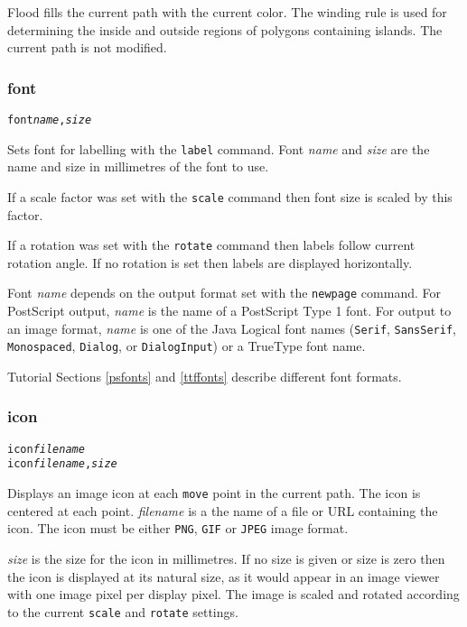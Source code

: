 Flood fills the current path with the current color.
The winding rule is used for determining the inside and outside
regions of polygons containing islands.
The current path is not modified.

\subsubsection{font}

\begin{alltt}
font \textit{name}, \textit{size}
\end{alltt}

Sets font for labelling with the \texttt{label} command.
Font \textit{name} and \textit{size} are the name and size in
millimetres of the font to use.

If a scale factor was set with the
\texttt{scale} command
then font size is scaled by this factor.

If a rotation was set with the
\texttt{rotate} command
then labels follow current rotation angle.
If no rotation is set then labels are displayed
horizontally.

Font \textit{name}
depends on the output format set with the
\texttt{newpage} command.
For PostScript output, \textit{name} is the name of a PostScript Type 1
font.
For output to an image format, \textit{name} is one of the Java Logical
font names (\texttt{Serif}, \texttt{SansSerif},
\texttt{Monospaced}, \texttt{Dialog}, or \texttt{DialogInput}) or a TrueType
font name.

Tutorial Sections \ref{psfonts} and \ref{ttffonts}
describe different font formats.

\subsubsection{icon}

\begin{alltt}
icon \textit{filename}
icon \textit{filename}, \textit{size}
\end{alltt}

Displays an image icon at each \texttt{move} point in
the current path.  The icon is centered at each point.
\textit{filename} is a the name of a file or URL containing the icon.
The icon must be either \texttt{PNG}, \texttt{GIF} or \texttt{JPEG}
image format.

\textit{size} is the size for the icon in millimetres.  If no size
is given or size is zero then the icon is displayed at its natural size,
as it would appear in an image viewer with one image pixel per display
pixel.
The image is scaled and rotated according to the current \texttt{scale}
and \texttt{rotate} settings.

